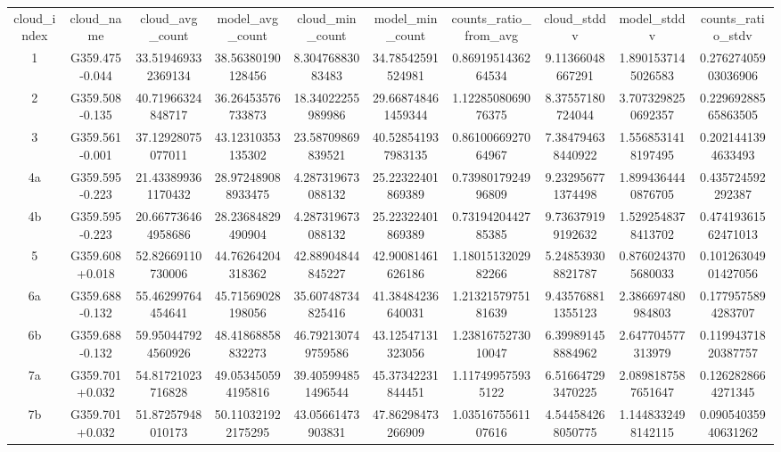 \begin{table}
\begin{tabular}{cccccccccc}
cloud_index & cloud_name & cloud_avg_count & model_avg_count & cloud_min_count & model_min_count & counts_ratio_from_avg & cloud_stddv & model_stddv & counts_ratio_stdv \\
1 & G359.475-0.044 & 33.519469332369134 & 38.56380190128456 & 8.30476883083483 & 34.78542591524981 & 0.8691951436264534 & 9.11366048667291 & 1.8901537145026583 & 0.27627405903036906 \\
2 & G359.508-0.135 & 40.71966324848717 & 36.26453576733873 & 18.34022255989986 & 29.668748461459344 & 1.1228508069076375 & 8.37557180724044 & 3.7073298250692357 & 0.22969288565863505 \\
3 & G359.561-0.001 & 37.12928075077011 & 43.12310353135302 & 23.58709869839521 & 40.528541937983135 & 0.8610066927064967 & 7.384794638440922 & 1.5568531418197495 & 0.2021441394633493 \\
4a & G359.595-0.223 & 21.433899361170432 & 28.972489088933475 & 4.287319673088132 & 25.22322401869389 & 0.7398017924996809 & 9.232956771374498 & 1.8994364440876705 & 0.435724592292387 \\
4b & G359.595-0.223 & 20.667736464958686 & 28.23684829490904 & 4.287319673088132 & 25.22322401869389 & 0.7319420442785385 & 9.736379199192632 & 1.5292548378413702 & 0.47419361562471013 \\
5 & G359.608+0.018 & 52.82669110730006 & 44.76264204318362 & 42.88904844845227 & 42.90081461626186 & 1.1801513202982266 & 5.248539308821787 & 0.8760243705680033 & 0.10126304901427056 \\
6a & G359.688-0.132 & 55.46299764454641 & 45.71569028198056 & 35.60748734825416 & 41.38484236640031 & 1.2132157975181639 & 9.435768811355123 & 2.386697480984803 & 0.1779575894283707 \\
6b & G359.688-0.132 & 59.950447924560926 & 48.41868858832273 & 46.792130749759586 & 43.12547131323056 & 1.2381675273010047 & 6.399891458884962 & 2.647704577313979 & 0.11994371820387757 \\
7a & G359.701+0.032 & 54.81721023716828 & 49.053450594195816 & 39.405994851496544 & 45.37342231844451 & 1.117499575935122 & 6.516647293470225 & 2.0898187587651647 & 0.1262828664271345 \\
7b & G359.701+0.032 & 51.87257948010173 & 50.110321922175295 & 43.05661473903831 & 47.86298473266909 & 1.0351675561107616 & 4.544584268050775 & 1.1448332498142115 & 0.09054035940631262 \\

\end{tabular}
\end{table}

